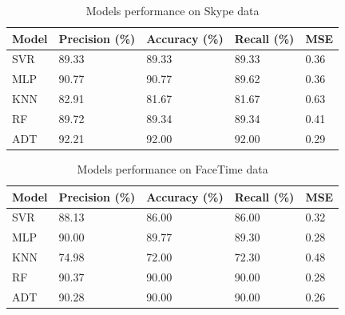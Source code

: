 \begin{table}[t]
    \centering
    \caption{Models performance on Skype data}
    \label{class-skype}
    \begin{tabular}{|l|l|l|l|l|}
        \hline
        \textbf{Model} & \textbf{Precision (\%)} & \textbf{Accuracy (\%)} & \textbf{Recall (\%)} & \textbf{MSE} \\ \hline
        SVR      & 89.33                      & 89.33                   & 89.33                     & 0.36                 \\ \hline
        MLP      & 90.77                      & 90.77                   & 89.62                     & 0.36                  \\ \hline
        KNN      & 82.91                      & 81.67                   & 81.67                     & 0.63                  \\ \hline
        RF       & 89.72                      & 89.34                   & 89.34                     & 0.41                  \\ \hline
        ADT       & 92.21                      & 92.00                   & 92.00                     &0.29                   \\ \hline 
    \end{tabular}
\end{table}

\begin{table}[t]
    \centering
    \caption{Models performance on FaceTime data}
    \label{class-facetime}
    \begin{tabular}{|l|l|l|l|l|}
        \hline
        \textbf{Model} & \textbf{Precision (\%)} & \textbf{Accuracy (\%)} & \textbf{Recall (\%)} & \textbf{MSE} \\ \hline
        SVR      & 88.13                   & 86.00                  & 86.00                &  0.32                 \\ \hline
        MLP      & 90.00                   & 89.77                  & 89.30                &  0.28                 \\ \hline
        KNN      & 74.98                   & 72.00                  & 72.30                &  0.48                 \\ \hline 
        RF       & 90.37                   & 90.00                  & 90.00                &  0.28                 \\ \hline 
        ADT       & 90.28                   & 90.00                  & 90.00                & 0.26                  \\ \hline 
    \end{tabular}
\end{table}

